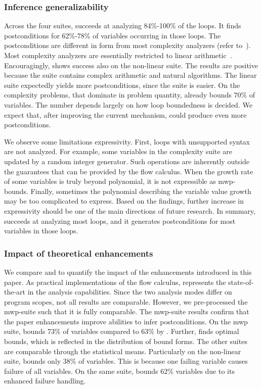 \subsubsection{Inference generalizability}
\label{subsec:rq1-res}

Across the four suites, \ndx{\impl} succeeds at analyzing 84\%-100\% of the loops.
It finds postconditions for 62\%-78\% of variables occurring in those loops.
The postconditions are different in form from most complexity analyzers (refer to~\cite{lommen2023,aubert2023b}).
Most complexity analyzers are essentially restricted to linear arithmetic~\cite{lommen2023}.
Encouragingly, \ndx{\impl} shows success also on the non-linear suite.
The results are positive because the suite contains complex arithmetic and natural algorithms.
The linear suite expectedly yields more postconditions, since the suite is easier.
On the complexity problems, that dominate in problem quantity, \ndx{\impl} already bounds 70\% of variables.
The number depends largely on how loop boundedness is decided.
We expect that, after improving the current mechanism, \ndx{\impl} could produce even more postconditions.

We observe some limitations \wrt expressivity.
First, loops with unsupported syntax are not analyzed.
For example, some variables in the complexity suite are updated by a random integer generator.
Such operations are inherently outside the guarantees that can be provided by the flow calculus.
When the growth rate of some variables is truly beyond polynomial, it is not expressible as mwp-bounds.
Finally, sometimes the polynomial describing the variable value growth may be too complicated to express.
Based on the findings, further increase in expressivity should be one of the main directions of future research.
In summary, \ndx{\impl} succeeds at analyzing most loops, and it generates postconditions for most variables in those loops.

\subsubsection{Impact of theoretical enhancements}\label{subsec:rq2-res}

We compare \ndx{\impl} and \ndx{\impf} to quantify the impact of the enhancements introduced in this paper.
As practical implementations of the flow calculus, \ndx{\impf} represents the state-of-the-art in the analysis capabilities.
Since the two analysis modes differ on program scopes, not all results are comparable.
However, we pre-processed the mwp-suite such that it is fully comparable.
The mwp-suite results confirm that the paper enhancements improve abilities to infer postconditions.
On the mwp suite, \ndx{\impl} bounds 73\% of variables compared to 63\% by \ndx{\impf}.
Further, \ndx{\impl} finds optimal bounds, which is reflected in the distribution of bound forms.
The other suites are comparable through the statistical means.
Particularly on the non-linear suite, \ndx{\impf} bounds only 38\% of variables.
This is because one failing variable causes failure of all variables.
On the same suite, \impl bounds 62\% variables due to its enhanced failure handling.

